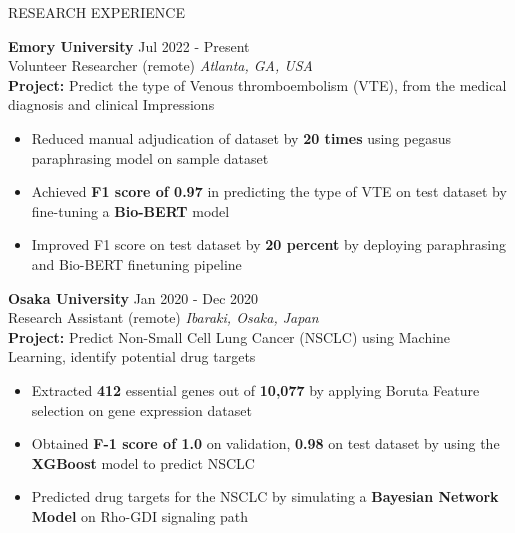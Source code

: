 \documentclass{resume} %
\begin{document}
\begin{rSection}{RESEARCH EXPERIENCE}


\textbf{Emory University} \hfill Jul 2022 - Present\\
Volunteer Researcher (remote) \hfill \textit{Atlanta, GA, USA}
\\ \textbf{Project:} Predict the type of Venous thromboembolism (VTE), from the medical diagnosis and clinical Impressions
 \begin{itemize}
    \itemsep -3pt {} 
     \item Reduced manual adjudication of dataset by \textbf{20 times} using pegasus paraphrasing model on sample dataset  
     \item Achieved \textbf{F1 score of 0.97} in predicting the type of VTE on test dataset by fine-tuning a \textbf{Bio-BERT} model 
    \item Improved F1 score on test dataset by \textbf{20 percent} by deploying paraphrasing and Bio-BERT finetuning pipeline
 \end{itemize}

\textbf{Osaka University} \hfill Jan 2020 - Dec 2020\\
Research Assistant (remote) \hfill \textit{Ibaraki, Osaka, Japan}
\\ \textbf{Project:} Predict Non-Small Cell Lung Cancer (NSCLC) using Machine Learning, identify potential drug targets
 \begin{itemize}
    \itemsep -3pt {} 
     \item Extracted \textbf{412} essential genes out of \textbf{10,077} by applying Boruta Feature selection on gene expression dataset
     \item Obtained \textbf{F-1 score of 1.0} on validation, \textbf{0.98} on test dataset by using the \textbf{XGBoost} model to predict NSCLC
     \item Predicted drug targets for the NSCLC by simulating a \textbf{Bayesian Network Model} on Rho-GDI signaling path 
 \end{itemize}
 

\end{rSection} 
\end{document}
